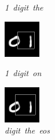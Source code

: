 \documentclass{article} %
\begin{document}
\begin{figure}[t]
  \caption{\mbox{\textit{1 digit the}}}
\endminipage\hfill
{}
  \includegraphics[width=\linewidth]{figures/1-0-25.png}
  \caption{\mbox{\textit{1 digit on}}}
\endminipage\hfill
{}
  \includegraphics[width=\linewidth]{figures/1-0-28.png}
  \caption{\mbox{\textit{digit the eos}}}
\endminipage\hfill


\end{figure}
\end{document}
